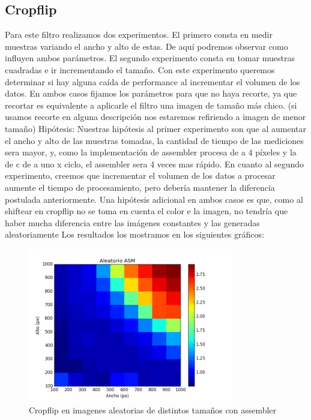 \subsection{Cropflip}
\hfill \break
Para este filtro realizamos dos experimentos. El primero consta en medir muestras variando el ancho y alto de estas. De aquí podremos observar como influyen ambos parámetros. El segundo experimento consta en tomar muestras cuadradas e ir incrementando el tamaño. Con este experimento queremos determinar si hay alguna caída de performance al incrementar el volumen de los datos. En ambos casos fijamos los parámetros para que no haya recorte, ya que recortar es equivalente a aplicarle el filtro una imagen de tamaño más chico. (si usamos recorte en alguna descripción nos estaremos refiriendo a imagen de menor tamaño)
\hfill \break
Hipótesis: Nuestras hipótesis al primer experimento son que al aumentar el ancho y alto de las muestras tomadas, la cantidad de tiempo de las mediciones sera mayor, y, como la implementación de assembler procesa de a 4 píxeles y la de c de a uno x ciclo,  el assembler sera 4 veces mas rápido.
En cuanto al segundo experimento, creemos que incrementar el volumen de los datos a procesar aumente el tiempo de procesamiento, pero debería mantener la diferencia postulada anteriormente. 
Una hipótesis adicional en ambos casos es que, como al shiftear en cropflip no se toma en cuenta el color e la imagen, no tendría que haber mucha diferencia entre las imágenes constantes y las generadas aleatoriamente
\hfill \break
 Los resultados los mostramos en los siguientes gráficos:
 
 \begin{figure} [H]
  \centering
  \includegraphics[width=0.8\textwidth]{recursos/aleatoriocropflipasm.png}
    \caption{ Cropflip en imagenes aleatorias de distintos tamaños con assembler }
\end{figure}
 
